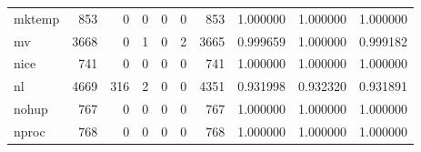 \begin{tabular}{lrrrrrrrrr}
mktemp    &                                                853 &                                                  0 &                                                  0 &                                                  0 &                                                  0 &                                                853 &                                           1.000000 &                               1.000000 &                             1.000000 \\
mv        &                                               3668 &                                                  0 &                                                  1 &                                                  0 &                                                  2 &                                               3665 &                                           0.999659 &                               1.000000 &                             0.999182 \\
nice      &                                                741 &                                                  0 &                                                  0 &                                                  0 &                                                  0 &                                                741 &                                           1.000000 &                               1.000000 &                             1.000000 \\
nl        &                                               4669 &                                                316 &                                                  2 &                                                  0 &                                                  0 &                                               4351 &                                           0.931998 &                               0.932320 &                             0.931891 \\
nohup     &                                                767 &                                                  0 &                                                  0 &                                                  0 &                                                  0 &                                                767 &                                           1.000000 &                               1.000000 &                             1.000000 \\
nproc     &                                                768 &                                                  0 &                                                  0 &                                                  0 &                                                  0 &                                                768 &                                           1.000000 &                               1.000000 &                             1.000000 \\

\end{tabular}

